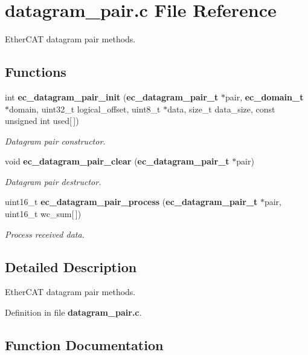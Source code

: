 \section{datagram\-\_\-pair.\-c File Reference}
\label{datagram__pair_8c}


Ether\-C\-A\-T datagram pair methods.  


\subsection*{Functions}
\begin{DoxyCompactItemize}
\item 
int {\bf ec\-\_\-datagram\-\_\-pair\-\_\-init} ({\bf ec\-\_\-datagram\-\_\-pair\-\_\-t} $\ast$pair, {\bf ec\-\_\-domain\-\_\-t} $\ast$domain, uint32\-\_\-t logical\-\_\-offset, uint8\-\_\-t $\ast$data, size\-\_\-t data\-\_\-size, const unsigned int used[$\,$])
\begin{DoxyCompactList}\small\item\em Datagram pair constructor. \end{DoxyCompactList}\item 
void {\bf ec\-\_\-datagram\-\_\-pair\-\_\-clear} ({\bf ec\-\_\-datagram\-\_\-pair\-\_\-t} $\ast$pair)
\begin{DoxyCompactList}\small\item\em Datagram pair destructor. \end{DoxyCompactList}\item 
uint16\-\_\-t {\bf ec\-\_\-datagram\-\_\-pair\-\_\-process} ({\bf ec\-\_\-datagram\-\_\-pair\-\_\-t} $\ast$pair, uint16\-\_\-t wc\-\_\-sum[$\,$])
\begin{DoxyCompactList}\small\item\em Process received data. \end{DoxyCompactList}\end{DoxyCompactItemize}


\subsection{Detailed Description}
Ether\-C\-A\-T datagram pair methods. 

Definition in file {\bf datagram\-\_\-pair.\-c}.



\subsection{Function Documentation}
